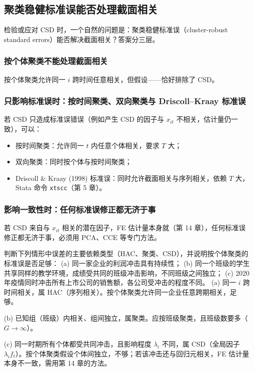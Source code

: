\subsection{聚类稳健标准误能否处理截面相关}

检验或应对 CSD 时，一个自然的问题是：聚类稳健标准误（cluster-robust standard errors）能否解决截面相关？答案分三层。

\subsubsection{按个体聚类不能处理截面相关}

按个体聚类允许同一 $i$ 跨时间任意相关，但假设——恰好排除了 CSD。

\subsubsection{只影响标准误时：按时间聚类、双向聚类与 Driscoll--Kraay 标准误}

若 CSD 只造成标准误错误（例如产生 CSD 的因子与 $x_{it}$ 不相关，估计量仍一致），可以：
\begin{itemize}
\item 按时间聚类：允许同一 $t$ 内任意个体相关，要求 $T$ 大；
\item 双向聚类：同时按个体与按时间聚类；
\item Driscoll \& Kraay (1998) 标准误：同时允许截面相关与序列相关，依赖 $T$ 大，Stata 命令 \texttt{xtscc}（第 5 章）。
\end{itemize}

\subsubsection{影响一致性时：任何标准误修正都无济于事}

若 CSD 来自与 $x_{it}$ 相关的潜在因子，FE 估计量本身就（第 14 章），任何标准误修正都无济于事，必须用 PCA、CCE 等专门方法。

\begin{prac}[识别依赖类型]\label{prac:U13a-deptype}
判断下列情形中误差的主要依赖类型（HAC、聚类、CSD），并说明按个体聚类的标准误是否足够：
(a) 同一家企业的利润冲击具有持续性；
(b) 同一个班级的学生共享同样的教学环境，成绩受共同的班级冲击影响，不同班级之间独立；
(c) 2020 年疫情同时冲击所有上市公司的销售额，各公司受冲击的程度不同。
\answer
(a) 同一 $i$ 跨时间相关，属 HAC（序列相关）。按个体聚类允许同一企业任意跨期相关，足够。

(b) 已知组（班级）内相关、组间独立，属聚类。应按班级聚类，且班级数要多（$G\to\infty$）。

(c) 同一时期所有个体都受共同冲击，且影响程度 $\lambda_i$ 不同，属 CSD（全局因子 $\lambda_if_t$）。按个体聚类假设个体间独立，不够；若该冲击还与回归元相关，FE 估计量本身不一致，需用第 14 章的方法。
\end{prac}

